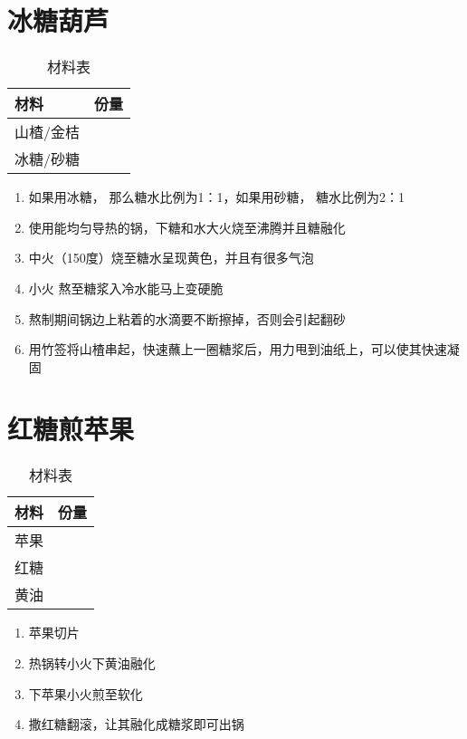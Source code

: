 \section{冰糖葫芦}

\begin{table}[H]
    \centering
    \begin{tabular}{|l||c|}\hline
     \textbf{材料}    &  \textbf{份量}\\ \hline\hline
    山楂/金桔 &  \\ \hline
    冰糖/砂糖 &  \\ \hline
    \end{tabular}
    \caption{材料表}
\end{table}

\begin{enumerate}
    \item 如果用冰糖， 那么糖水比例为1：1，如果用砂糖， 糖水比例为2：1
    \item 使用能均匀导热的锅，下糖和水大火烧至沸腾并且糖融化
    \item 中火（150度）烧至糖水呈现黄色，并且有很多气泡
    \item 小火 熬至糖浆入冷水能马上变硬脆
    \item 熬制期间锅边上粘着的水滴要不断擦掉，否则会引起翻砂
    \item 用竹签将山楂串起，快速蘸上一圈糖浆后，用力甩到油纸上，可以使其快速凝固
\end{enumerate}


\section{红糖煎苹果}

\begin{table}[H]
    \centering
    \begin{tabular}{|l||c|}\hline
     \textbf{材料}    &  \textbf{份量}\\ \hline\hline
    苹果 &  \\ \hline
    红糖 &  \\ \hline
    黄油  &  \\ \hline
    \end{tabular}
    \caption{材料表}
\end{table}

\begin{enumerate}
    \item 苹果切片
    \item 热锅转小火下黄油融化
    \item 下苹果小火煎至软化
    \item 撒红糖翻滚，让其融化成糖浆即可出锅
\end{enumerate}


